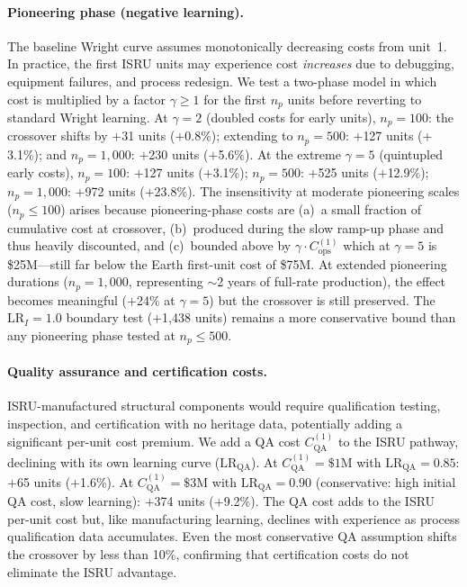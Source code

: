 \documentclass[preprint,12pt]{elsarticle}
\begin{document}
\paragraph{Pioneering phase (negative learning).} The baseline Wright curve assumes monotonically decreasing costs from unit~1. In practice, the first ISRU units may experience cost \emph{increases} due to debugging, equipment failures, and process redesign. We test a two-phase model in which cost is multiplied by a factor $\gamma \geq 1$ for the first $n_p$ units before reverting to standard Wright learning. At $\gamma = 2$ (doubled costs for early units), $n_p = 100$: the crossover shifts by $+$31 units ($+$0.8\%); extending to $n_p = 500$: $+$127 units ($+$3.1\%); and $n_p = 1{,}000$: $+$230 units ($+$5.6\%). At the extreme $\gamma = 5$ (quintupled early costs), $n_p = 100$: $+$127 units ($+$3.1\%); $n_p = 500$: $+$525 units ($+$12.9\%); $n_p = 1{,}000$: $+$972 units ($+$23.8\%). The insensitivity at moderate pioneering scales ($n_p \leq 100$) arises because pioneering-phase costs are (a)~a small fraction of cumulative cost at crossover, (b)~produced during the slow ramp-up phase and thus heavily discounted, and (c)~bounded above by $\gamma \cdot C_{\mathrm{ops}}^{(1)}$ which at $\gamma = 5$ is \$25M---still far below the Earth first-unit cost of \$75M. At extended pioneering durations ($n_p = 1{,}000$, representing $\sim$2 years of full-rate production), the effect becomes meaningful ($+$24\% at $\gamma = 5$) but the crossover is still preserved. The $\mathrm{LR}_I = 1.0$ boundary test ($+$1{,}438 units) remains a more conservative bound than any pioneering phase tested at $n_p \leq 500$.

\paragraph{Quality assurance and certification costs.} ISRU-manufactured structural components would require qualification testing, inspection, and certification with no heritage data, potentially adding a significant per-unit cost premium. We add a QA cost $C_{\mathrm{QA}}^{(1)}$ to the ISRU pathway, declining with its own learning curve ($\mathrm{LR}_{\mathrm{QA}}$). At $C_{\mathrm{QA}}^{(1)} = \$1$M with $\mathrm{LR}_{\mathrm{QA}} = 0.85$: $+$65 units ($+$1.6\%). At $C_{\mathrm{QA}}^{(1)} = \$3$M with $\mathrm{LR}_{\mathrm{QA}} = 0.90$ (conservative: high initial QA cost, slow learning): $+$374 units ($+$9.2\%). The QA cost adds to the ISRU per-unit cost but, like manufacturing learning, declines with experience as process qualification data accumulates. Even the most conservative QA assumption shifts the crossover by less than 10\%, confirming that certification costs do not eliminate the ISRU advantage.
\end{document}
